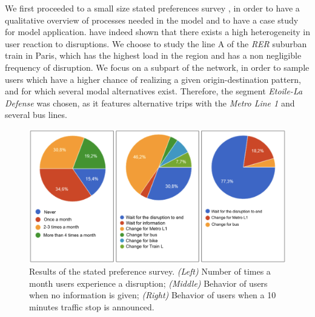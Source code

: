 \documentclass[3p,times,procedia]{elsarticle}
\begin{document}


We first proceeded to a small size stated preferences survey %
, in order to have a qualitative overview of processes needed in the model and to have a case study for model application. \cite{martin2016strategies} have indeed shown that there exists a high heterogeneity in user reaction to disruptions. We choose to study the line A of the \emph{RER} suburban train in Paris, which has the highest load in the region and has a non negligible frequency of disruption. We focus on a subpart of the network, in order to sample users which have a higher chance of realizing a given origin-destination pattern, and for which several modal alternatives exist. Therefore, the segment \emph{Etoile-La Defense} was chosen, as it features alternative trips with the \emph{Metro Line 1} and several bus lines.


\begin{figure}[t]\vspace*{4pt}
\centerline{\includegraphics[width=0.45\linewidth]{figures/Fig1.png}}
\caption{Results of the stated preference survey. \textit{(Left)} Number of times a month users experience a disruption; \textit{(Middle)} Behavior of users when no information is given; \textit{(Right)} Behavior of users when a 10 minutes traffic stop is announced.\label{fig:fig1}}
\end{figure}
\end{document}
